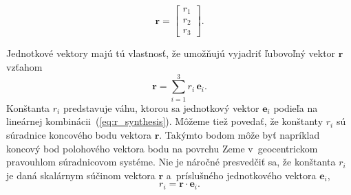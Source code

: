\documentclass[a4paper,12pt]{book}
\let\vec\mathbf
\begin{document}
\begin{equation}
\vec r =
\begin{bmatrix}
r_1\\
r_2\\
r_3
\end{bmatrix}
{.}
\end{equation}

Jednotkové vektory majú tú vlastnosť, že umožňujú vyjadriť ľubovoľný vektor
$\vec r$ vzťahom
%
\begin{equation}
\label{eq:r_synthesis}
\vec r = \sum_{i = 1}^3 r_i \, \vec e_i{.}
\end{equation}
%
Konštanta $r_i$ predstavuje váhu, ktorou sa jednotkový vektor $\vec e_i$
podieľa na lineárnej kombinácii~(\ref{eq:r_synthesis}).  Môžeme tiež povedať,
že konštanty $r_i$ sú súradnice koncového bodu vektora $\vec r$.  Takýmto bodom
môže byť napríklad koncový bod polohového vektora bodu na povrchu Zeme
v~geocentrickom pravouhlom súradnicovom systéme.  Nie je náročné presvedčiť sa,
že konštanta $r_i$ je daná skalárnym súčinom vektora $\vec r$ a~príslušného
jednotkového vektora $\vec e_i$,
%
\begin{equation}
\label{eq:r_analysis}
r_i = \vec r \cdot \vec e_i{.}
\end{equation}
\end{document}
